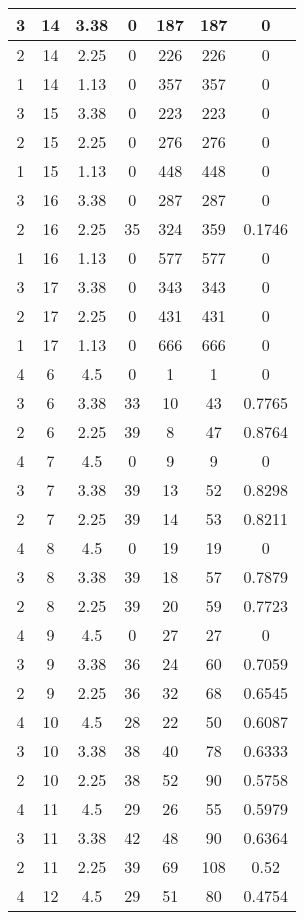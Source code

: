 \documentclass[letterpaper, 12pt]{article}
\begin{document}
\begin{longtable}{|c|c|c|c|c|c|c|}
\hline
3 & 14 & 3.38 & 0 & 187 & 187 & 0 \\
\hline
2 & 14 & 2.25 & 0 & 226 & 226 & 0 \\
\hline
1 & 14 & 1.13 & 0 & 357 & 357 & 0 \\
\hline
3 & 15 & 3.38 & 0 & 223 & 223 & 0 \\
\hline
2 & 15 & 2.25 & 0 & 276 & 276 & 0 \\
\hline
1 & 15 & 1.13 & 0 & 448 & 448 & 0 \\
\hline
3 & 16 & 3.38 & 0 & 287 & 287 & 0 \\
\hline
2 & 16 & 2.25 & 35 & 324 & 359 & 0.1746 \\
\hline
1 & 16 & 1.13 & 0 & 577 & 577 & 0 \\
\hline
3 & 17 & 3.38 & 0 & 343 & 343 & 0 \\
\hline
2 & 17 & 2.25 & 0 & 431 & 431 & 0 \\
\hline
1 & 17 & 1.13 & 0 & 666 & 666 & 0 \\
\hline
4 & 6 & 4.5 & 0 & 1 & 1 & 0 \\
\hline
3 & 6 & 3.38 & 33 & 10 & 43 & 0.7765 \\
\hline
2 & 6 & 2.25 & 39 & 8 & 47 & 0.8764 \\
\hline
4 & 7 & 4.5 & 0 & 9 & 9 & 0 \\
\hline
3 & 7 & 3.38 & 39 & 13 & 52 & 0.8298 \\
\hline
2 & 7 & 2.25 & 39 & 14 & 53 & 0.8211 \\
\hline
4 & 8 & 4.5 & 0 & 19 & 19 & 0 \\
\hline
3 & 8 & 3.38 & 39 & 18 & 57 & 0.7879 \\
\hline
2 & 8 & 2.25 & 39 & 20 & 59 & 0.7723 \\
\hline
4 & 9 & 4.5 & 0 & 27 & 27 & 0 \\
\hline
3 & 9 & 3.38 & 36 & 24 & 60 & 0.7059 \\
\hline
2 & 9 & 2.25 & 36 & 32 & 68 & 0.6545 \\
\hline
4 & 10 & 4.5 & 28 & 22 & 50 & 0.6087 \\
\hline
3 & 10 & 3.38 & 38 & 40 & 78 & 0.6333 \\
\hline
2 & 10 & 2.25 & 38 & 52 & 90 & 0.5758 \\
\hline
4 & 11 & 4.5 & 29 & 26 & 55 & 0.5979 \\
\hline
3 & 11 & 3.38 & 42 & 48 & 90 & 0.6364 \\
\hline
2 & 11 & 2.25 & 39 & 69 & 108 & 0.52 \\
\hline
4 & 12 & 4.5 & 29 & 51 & 80 & 0.4754 \\

\end{longtable}
\end{document}
